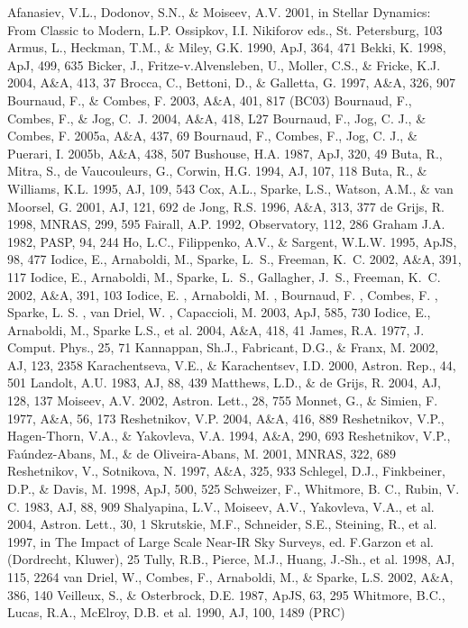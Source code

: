 \documentclass[]{aa}
\begin{document}
\begin{thebibliography}{}
\bibitem{} Afanasiev, V.L., Dodonov, S.N., \& Moiseev, A.V. 2001,
in Stellar Dynamics: From Classic to Modern, L.P. Ossipkov,
I.I. Nikiforov eds., St. Petersburg, 103
\bibitem{} Armus, L., Heckman, T.M., \& Miley, G.K. 1990, ApJ, 364, 471
\bibitem{} Bekki, K. 1998, ApJ, 499, 635
\bibitem{} Bicker, J., Fritze-v.Alvensleben, U., Moller, C.S., \&
Fricke, K.J. 2004, A\&A, 413, 37
\bibitem{} Brocca, C., Bettoni, D., \& Galletta, G. 1997, A\&A, 326, 907
\bibitem{} Bournaud, F., \& Combes, F. 2003, A\&A, 401, 817 (BC03)
\bibitem{} Bournaud, F., Combes, F., \& Jog, C.~J. 2004, A\&A, 418, L27 
\bibitem{} Bournaud, F., Jog, C. J., \& Combes, F. 2005a, A\&A, 437, 69
\bibitem{} Bournaud, F., Combes, F., Jog, C. J., \& Puerari, I. 2005b, A\&A, 438, 507
\bibitem{} Bushouse, H.A. 1987, ApJ, 320, 49
\bibitem{} Buta, R., Mitra, S., de Vaucouleurs, G., Corwin, H.G. 1994,
AJ, 107, 118
\bibitem{} Buta, R., \& Williams, K.L. 1995, AJ, 109, 543
\bibitem{} Cox, A.L., Sparke, L.S., Watson, A.M., \& van Moorsel, G.
2001, AJ, 121, 692
\bibitem{} de Jong, R.S. 1996, A\&A, 313, 377
\bibitem{} de Grijs, R. 1998, MNRAS, 299, 595
\bibitem{} Fairall, A.P. 1992, Observatory, 112, 286
\bibitem{} Graham J.A. 1982, PASP, 94, 244
\bibitem{} Ho, L.C., Filippenko, A.V., \& Sargent, W.L.W. 1995,
ApJS, 98, 477
\bibitem{} Iodice, E., Arnaboldi, M., Sparke, L.~S., Freeman, K.~C. 2002, A\&A, 391, 117
\bibitem{} Iodice, E., Arnaboldi, M., Sparke, L.~S., Gallagher, J.~S., Freeman, K.~C. 
2002, A\&A, 391, 103
\bibitem{} Iodice, E. , Arnaboldi, M. , Bournaud, F. , Combes, F. , 
Sparke, L. S. , van Driel, W. , Capaccioli, M. 2003, ApJ, 585, 730
\bibitem{} Iodice, E., Arnaboldi, M., Sparke L.S., et al. 2004,
A\&A, 418, 41
\bibitem{} James, R.A. 1977, J. Comput. Phys., 25, 71
\bibitem{} Kannappan, Sh.J., Fabricant, D.G., \& Franx, M. 2002,
AJ, 123, 2358
\bibitem{} Karachentseva, V.E., \& Karachentsev, I.D. 2000,
Astron. Rep., 44, 501
\bibitem{} Landolt, A.U. 1983, AJ, 88, 439
\bibitem{} Matthews, L.D., \& de Grijs, R. 2004, AJ, 128, 137
\bibitem{} Moiseev, A.V. 2002, Astron. Lett., 28, 755
\bibitem{} Monnet, G., \& Simien, F. 1977, A\&A, 56, 173
\bibitem{} Reshetnikov, V.P. 2004, A\&A, 416, 889
\bibitem{} Reshetnikov, V.P., Hagen-Thorn, V.A., \& Yakovleva, V.A.
1994, A\&A, 290, 693
\bibitem{} Reshetnikov, V.P., Fa\'{u}ndez-Abans, M., \&
de Oliveira-Abans, M. 2001, MNRAS, 322, 689
\bibitem{} Reshetnikov, V., Sotnikova, N. 1997, A\&A, 325, 933
\bibitem{} Schlegel, D.J., Finkbeiner, D.P., \& Davis, M. 1998, ApJ,
500, 525
\bibitem{} Schweizer, F., Whitmore, B. C., Rubin, V. C. 1983, AJ, 88, 909
\bibitem{} Shalyapina, L.V., Moiseev, A.V., Yakovleva, V.A., et al.
2004, Astron. Lett., 30, 1
\bibitem{} Skrutskie, M.F., Schneider, S.E., Steining, R., et al. 1997,
in The Impact of Large Scale Near-IR Sky Surveys, ed. F.Garzon et al.
(Dordrecht, Kluwer), 25
\bibitem{} Tully, R.B., Pierce, M.J., Huang, J.-Sh., et al. 1998,
AJ, 115, 2264
\bibitem{} van Driel, W., Combes, F., Arnaboldi, M., \& Sparke, L.S.
2002, A\&A, 386, 140 
\bibitem{} Veilleux, S., \& Osterbrock, D.E. 1987, ApJS, 63, 295
\bibitem{} Whitmore, B.C., Lucas, R.A., McElroy, D.B. et al. 1990,
AJ, 100, 1489 (PRC)

\end{thebibliography}

\end{document}
